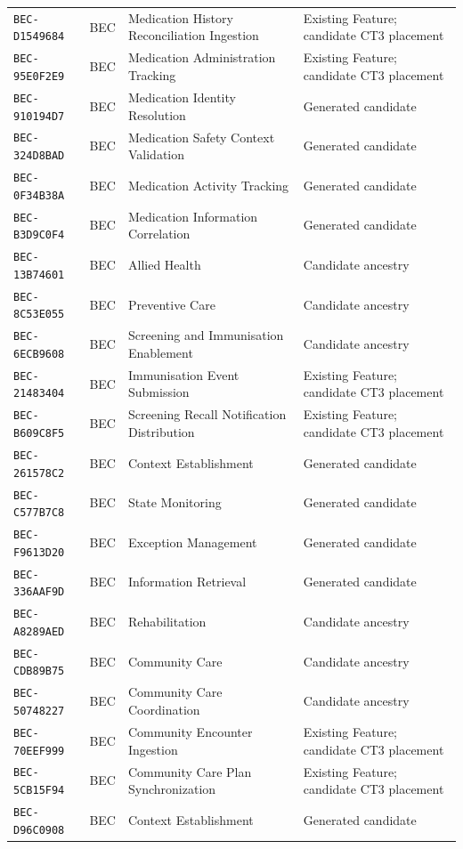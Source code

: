 \documentclass[11pt,a4paper,openany]{book}
\begin{document}
\begin{longtable}{@{}p{.19\linewidth}p{.12\linewidth}p{.39\linewidth}p{.24\linewidth}@{}}
\texttt{BEC-D1549684} & BEC & Medication History Reconciliation Ingestion & Existing Feature; candidate CT3 placement \\
\texttt{BEC-95E0F2E9} & BEC & Medication Administration Tracking & Existing Feature; candidate CT3 placement \\
\texttt{BEC-910194D7} & BEC & Medication Identity Resolution & Generated candidate \\
\texttt{BEC-324D8BAD} & BEC & Medication Safety Context Validation & Generated candidate \\
\texttt{BEC-0F34B38A} & BEC & Medication Activity Tracking & Generated candidate \\
\texttt{BEC-B3D9C0F4} & BEC & Medication Information Correlation & Generated candidate \\
\texttt{BEC-13B74601} & BEC & Allied Health & Candidate ancestry \\
\texttt{BEC-8C53E055} & BEC & Preventive Care & Candidate ancestry \\
\texttt{BEC-6ECB9608} & BEC & Screening and Immunisation Enablement & Candidate ancestry \\
\texttt{BEC-21483404} & BEC & Immunisation Event Submission & Existing Feature; candidate CT3 placement \\
\texttt{BEC-B609C8F5} & BEC & Screening Recall Notification Distribution & Existing Feature; candidate CT3 placement \\
\texttt{BEC-261578C2} & BEC & Context Establishment & Generated candidate \\
\texttt{BEC-C577B7C8} & BEC & State Monitoring & Generated candidate \\
\texttt{BEC-F9613D20} & BEC & Exception Management & Generated candidate \\
\texttt{BEC-336AAF9D} & BEC & Information Retrieval & Generated candidate \\
\texttt{BEC-A8289AED} & BEC & Rehabilitation & Candidate ancestry \\
\texttt{BEC-CDB89B75} & BEC & Community Care & Candidate ancestry \\
\texttt{BEC-50748227} & BEC & Community Care Coordination & Candidate ancestry \\
\texttt{BEC-70EEF999} & BEC & Community Encounter Ingestion & Existing Feature; candidate CT3 placement \\
\texttt{BEC-5CB15F94} & BEC & Community Care Plan Synchronization & Existing Feature; candidate CT3 placement \\
\texttt{BEC-D96C0908} & BEC & Context Establishment & Generated candidate \\

\end{longtable}
\end{document}

